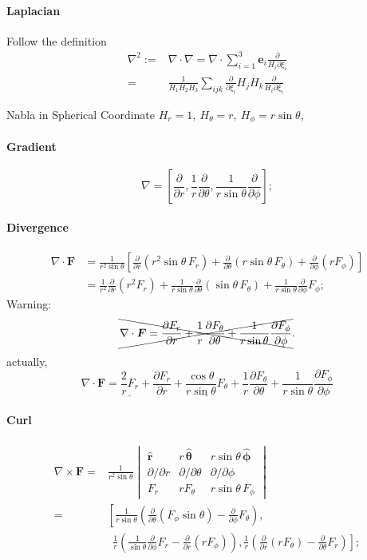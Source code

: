 \documentclass{article}
\newcommand{\pd}[2]{\frac{\partial #1}{\partial #2}}%
\newcommand{\kh}[1]{\left(#1\right)}
\newcommand{\fkh}[1]{\left[#1\right]}
\newcommand{\ubm}[1]{\hat{\bm #1}}%
\newcommand{\ibm}[1]{\,\hat{\bm #1}}%
\begin{document}
\paragraph{Laplacian} Follow the definition
\begin{align*}
	\nabla^2:= & \nabla\cdot\nabla=\nabla\cdot\sum_{i=1}^3\bm e_i\frac\partial{H_i\partial\xi_i} \\
	=          & \frac1{H_1H_2H_3}\sum_{ijk}\pd{}{\xi_i}H_jH_k\frac{\partial}{H_i\partial\xi_i}
\end{align*}
\begin{example}{Nabla in Spherical Coordinate}{}
	$H_r=1,~H_\theta=r,~H_\phi=r\sin\theta$,
	\paragraph{Gradient}
	$$\nabla=\fkh{\pd{}r,\frac1r\pd{}\theta,\frac1{r\sin\theta}\pd{}\phi};$$
	\paragraph{Divergence}
	\begin{align*}
		\nabla\cdot\bm F & =\frac1{r^2\sin\theta}\fkh{\pd{}r\kh{r^2\sin\theta\,F_r}+\pd{}\theta\kh{r\sin\theta\,F_\theta}+\pd{}\phi\kh{rF_\phi}}      \\
		                 & =\frac1{r^2}\pd{}r\kh{r^2F_r}+\frac1{r\sin\theta}\pd{}\theta\kh{\sin\theta\,F_\theta}+\frac1{r\sin\theta}\pd{}\phi F_\phi;
	\end{align*}
	Warning:
	$$\xcancel{\nabla\cdot\bm F=\pd{F_r}r+\frac1r\pd{F_\theta}\theta+\frac1{r\sin\theta}\pd{F_\phi}\phi}.$$
	actually,
	$$\nabla\cdot\bm F=\underline{\frac2rF_r}+\pd{F_r}r+\underline{\frac{\cos\theta}{r\sin\theta}F_\theta}+\frac1r\pd{F_\theta}\theta+\frac1{r\sin\theta}\pd{F_\phi}\phi$$
	\paragraph{Curl}
	\begin{align*}
		\nabla\times\bm F= & \frac1{r^2\sin\theta}
		\begin{vmatrix}
			\ubm r              & r\ibm\theta             & r\sin\theta\ibm\phi   \\
			\partial/\partial r & \partial/\partial\theta & \partial/\partial\phi \\
			F_r                 & rF_\theta               & r\sin\theta\,F_\phi
		\end{vmatrix}                                                                                                                    \\
		=                  & \left[\frac1{r\sin\theta}\kh{\pd{}\theta(F_\phi\sin\theta)-\pd{}\phi F_\theta},\right.                                    \\
		                   & ~~\frac1r\kh{\frac1{\sin\theta}\pd{}\phi F_r-\pd{}r(rF_\phi)},\left.\frac1r\kh{\pd{}r(rF_\theta)-\pd{}\theta F_r}\right];
	\end{align*}

\end{example}
\end{document}
